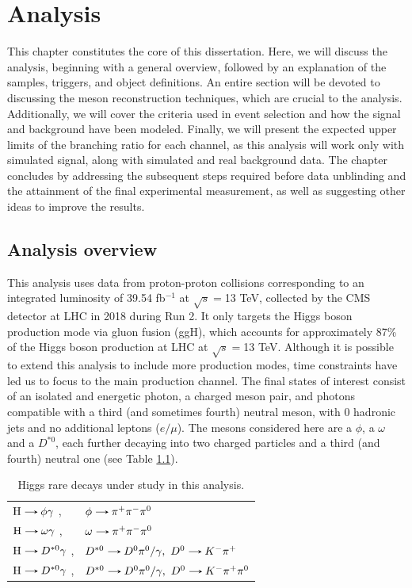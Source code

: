 \chapter[Analysis]{Analysis}\label{chap:analysis}

This chapter constitutes the core of this dissertation. Here, we will discuss the analysis, beginning with a general overview, followed by an explanation of the samples, triggers, and object definitions. An entire section will be devoted to discussing the meson reconstruction techniques, which are crucial to the analysis. Additionally, we will cover the criteria used in event selection and how the signal and background have been modeled. Finally, we will present the expected upper limits of the branching ratio for each channel, as this analysis will work only with simulated signal, along with simulated and real background data. The chapter concludes by addressing the subsequent steps required before data unblinding and the attainment of the final experimental measurement, as well as suggesting other ideas to improve the results.

\section{Analysis overview}\label{sec:analysis_overview}

This analysis uses data from proton-proton collisions corresponding to an integrated luminosity of 39.54 fb$^{-1}$ at $\sqrt{s}=$13 TeV, collected by the CMS detector at LHC in 2018 during Run 2. It only targets the Higgs boson production mode via gluon fusion (ggH), which accounts for approximately 87\% of the Higgs boson production at LHC at $\sqrt{s}=$13 TeV. Although it is possible to extend this analysis to include more production modes, time constraints have led us to focus to the main production channel. The final states of interest consist of an isolated and energetic photon, a charged meson pair, and photons compatible with a third (and sometimes fourth) neutral meson, with 0 hadronic jets and no additional leptons ($e/\mu$). The mesons considered here are a $\phi$, a $\omega$ and a $D^{*0}$, each further decaying into two charged particles and a third (and fourth) neutral one (see Table \ref{tab:Higgs_rare_decays_three}).

\begin{table}[ht]
    \centering
    \begin{tabular}{ll}
        $\text{H}\decaysto \phi\gamma$ ,& $\phi\decaysto \pi^+\pi^-\pi^0$ \\
        $\text{H}\decaysto \omega\gamma$ ,& $\omega\decaysto \pi^+\pi^-\pi^0$\\
        $\text{H}\decaysto D^{*0}\gamma$ ,& $D^{*0}\decaysto D^{0}\pi^{0}/\gamma,\ D^{0}\decaysto K^{-}\pi^{+}$\\
        $\text{H}\decaysto D^{*0}\gamma$ ,& $D^{*0}\decaysto D^{0}\pi^{0}/\gamma,\ D^{0}\decaysto K^{-}\pi^{+}\pi^{0}$
    \end{tabular}
    \caption{Higgs rare decays under study in this analysis.}
    \label{tab:Higgs_rare_decays_three}
\end{table}


